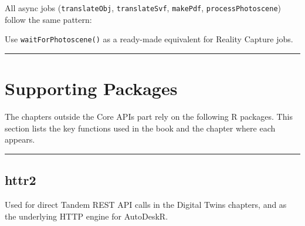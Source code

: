 \documentclass[
  11pt,
  letterpaper,
  DIV=11,
  numbers=noendperiod]{scrreprt}
\newenvironment{Shaded}{\begin{snugshade}}{\end{snugshade}}
\newcommand{\AttributeTok}[1]{\textcolor[rgb]{0.40,0.45,0.13}{#1}}
\newcommand{\ControlFlowTok}[1]{\textcolor[rgb]{0.00,0.23,0.31}{\textbf{#1}}}
\newcommand{\DecValTok}[1]{\textcolor[rgb]{0.68,0.00,0.00}{#1}}
\newcommand{\FunctionTok}[1]{\textcolor[rgb]{0.28,0.35,0.67}{#1}}
\newcommand{\NormalTok}[1]{\textcolor[rgb]{0.00,0.23,0.31}{#1}}
\newcommand{\OtherTok}[1]{\textcolor[rgb]{0.00,0.23,0.31}{#1}}
\newcommand{\SpecialCharTok}[1]{\textcolor[rgb]{0.37,0.37,0.37}{#1}}
\newcommand{\StringTok}[1]{\textcolor[rgb]{0.13,0.47,0.30}{#1}}
\begin{document}
All async jobs (\texttt{translateObj}, \texttt{translateSvf},
\texttt{makePdf}, \texttt{processPhotoscene}) follow the same pattern:

\begin{Shaded}
\end{Shaded}

Use \texttt{waitForPhotoscene()} as a ready-made equivalent for Reality
Capture jobs.

\begin{center}\rule{0.5\linewidth}{0.5pt}\end{center}

\chapter{Supporting Packages}\label{supporting-packages}

The chapters outside the Core APIs part rely on the following R
packages. This section lists the key functions used in the book and the
chapter where each appears.

\begin{center}\rule{0.5\linewidth}{0.5pt}\end{center}

\section{httr2}\label{httr2}

Used for direct Tandem REST API calls in the Digital Twins chapters, and
as the underlying HTTP engine for AutoDeskR.
\end{document}
